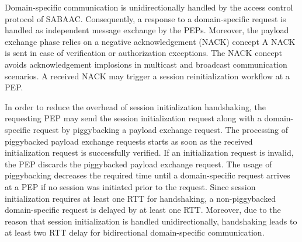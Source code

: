 \begin{description}
    Domain-specific communication is unidirectionally handled by the access control protocol of SABAAC.
    Consequently, a response to a domain-specific request is handled as independent message exchange by the PEPs.
    Moreover, the payload exchange phase relies on a negative acknowledgement (NACK) concept
    A NACK is sent in case of verification or authorization exceptions.
    The NACK concept avoids acknowledgement implosions in multicast and broadcast communication scenarios.
    A received NACK may trigger a session reinitialization workflow at a PEP.

    In order to reduce the overhead of session initialization handshaking, the requesting PEP may send the session initialization request along with a domain-specific request by piggybacking a payload exchange request.
    The processing of piggybacked payload exchange requests starts as soon as the received initialization request is successfully verified.
    If an initialization request is invalid, the PEP discards the piggybacked payload exchange request.
    The usage of piggybacking decreases the required time until a domain-specific request arrives at a PEP if no session was initiated prior to the request.
    Since session initialization requires at least one RTT for handshaking, a non-piggybacked domain-specific request is delayed by at least one RTT.
    Moreover, due to the reason that session initialization is handled unidirectionally, handshaking leads to at least two RTT delay for bidirectional domain-specific communication.


\end{description}
